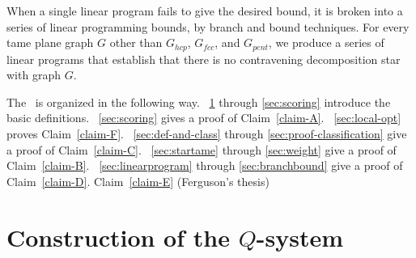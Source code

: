 When a single linear program fails to give the desired bound, it
is broken into a series of linear programming bounds, by branch
and bound techniques.  For every tame plane graph $G$ other than
$G_{hcp}$, $G_{fcc}$, and $G_{pent}$, we
produce a series of linear programs that establish that there is
no contravening decomposition star with graph $G$.

The \paper~is organized in the following way.
\Chaps~\ref{sec:construction} through \ref{sec:scoring} introduce
the basic definitions.  \Chap~\ref{sec:scoring} gives a proof of
Claim~\ref{claim-A}. \Chap~\ref{sec:local-opt} proves
Claim~\ref{claim-F}. 
\Chaps~\ref{sec:def-and-class} through
\ref{sec:proof-classification} give a proof of Claim~\ref{claim-C}.
\Chaps~\ref{sec:startame} through \ref{sec:weight} give a proof of
Claim~\ref{claim-B}. \Chaps~\ref{sec:linearprogram} through
\ref{sec:branchbound} give a proof of Claim~\ref{claim-D}.
Claim~\ref{claim-E} (Ferguson's thesis)  


\chapter{Construction of the $Q$-system}
\label{sec:construction}



